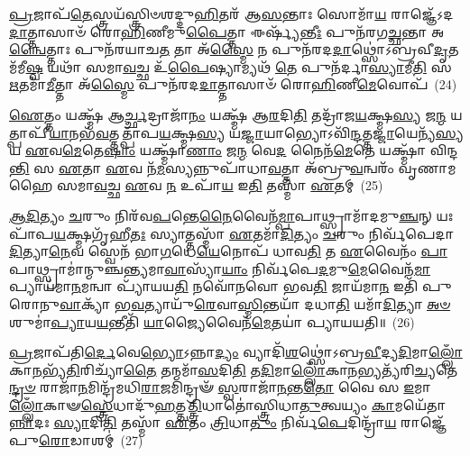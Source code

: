 {\anuvakamend[{\-\ul{𑌏}\-𑌵 𑌨𑌿𑌰𑌗𑍍𑌰᳴\-\ul{𑌮𑍇}\-𑌤𑌸𑍍𑌯᳴ \ul{𑌚}\-𑌤𑍍𑌵𑌾𑌰𑌿᳴ 𑌚}]}%

\-\ul{𑌪𑍍𑌰}\-𑌜𑌾𑌪᳴\-\ul{𑌤𑍇}\-𑌸𑍍𑌤𑍍𑌰𑌯᳴𑌸𑍍𑌤𑍍𑌰𑌿𑍞𑌶𑌦𑍍𑌦𑍁\-\ul{𑌹𑌿}\-𑌤𑌰᳴ 𑌆\-\ul{𑌸}\-𑌨𑍍𑌤𑌾𑌃 𑌸𑍋𑌮𑌾᳴\-\ul{𑌯} 𑌰𑌾𑌜𑍍𑌞𑍇᳴\-𑌽𑌦\-\ul{𑌦𑌾}\-𑌤𑍍𑌤𑌾𑌸𑌾𑍞᳴ 𑌰𑍋\-\ul{𑌹𑌿}\-𑌣𑍀𑌮𑍁\-\ul{𑌪𑍈}\-𑌤𑍍𑌤𑌾 𑌈𑌰𑍍𑌷𑍍𑌯᳴\-\ul{𑌨𑍍𑌤𑍀𑌃} 𑌪𑍁𑌨᳴𑌰𑌗\-\ul{𑌚𑍍𑌛}\-𑌨𑍍𑌤𑌾 𑌅\-\ul{𑌨𑍍𑌵𑍈}\-𑌤𑍍𑌤𑌾𑌃 𑌪𑍁𑌨᳴𑌰𑌯𑌾𑌚\-\ul{𑌤} 𑌤𑌾 𑌅᳴\-\ul{𑌸𑍍𑌮𑍈} 𑌨 𑌪𑍁𑌨᳴𑌰𑌦\-\ul{𑌦𑌾}\-𑌥𑍍𑌸𑍋॑\-𑌽𑌬𑍍𑌰𑌵𑍀\-\ul{𑌦𑍃}\-𑌤𑌮᳴𑌮𑍀\-\ul{𑌷𑍍𑌵} 𑌯𑌥𑌾᳴ 𑌸𑌮𑌾\-\ul{𑌵}\-𑌚𑍍𑌛 𑌉᳴\-\ul{𑌪𑍈}\-𑌷𑍍𑌯𑌾𑌮𑍍𑌯𑌥᳴ \ul{𑌤𑍇} 𑌪𑍁𑌨᳴𑌰𑍍𑌦𑌾\-\ul{𑌸𑍍𑌯𑌾}\-𑌮𑍀\-\ul{𑌤𑌿} 𑌸 \ul{𑌋}\-𑌤𑌮𑌾᳴\-\ul{𑌮𑍀}\-𑌤𑍍𑌤𑌾 𑌅᳴\-\ul{𑌸𑍍𑌮𑍈} 𑌪𑍁𑌨᳴𑌰𑌦\-\ul{𑌦𑌾}\-𑌤𑍍𑌤𑌾𑌸𑌾𑍞᳴ 𑌰𑍋\-\ul{𑌹𑌿}\-𑌣𑍀\-\ul{𑌮𑍇}\-𑌵𑍋𑌪᳴~(24)

\-\ul{𑌐}\-𑌤𑍍𑌤𑌂 𑌯𑌕𑍍𑌷𑍍𑌮᳴ 𑌆\-\ul{𑌰𑍍𑌚𑍍𑌛}\-𑌦𑍍𑌰𑌾𑌜𑌾᳴\-\ul{𑌨𑌂} 𑌯𑌕𑍍𑌷𑍍𑌮᳴ 𑌆\-\ul{𑌰}\-𑌦𑌿\-\ul{𑌤𑌿} 𑌤𑌦𑍍𑌰𑌾᳴𑌜\-\ul{𑌯}\-𑌕𑍍𑌷𑍍𑌮\-\ul{𑌸𑍍𑌯} 𑌜\-\ul{𑌨𑍍𑌮} 𑌯𑌤𑍍𑌪𑌾𑌪𑍀᳴\-\ul{𑌯𑌾}\-𑌨𑌭᳴\-\ul{𑌵}\-𑌤𑍍𑌤𑌤𑍍𑌪𑌾᳴𑌪\-\ul{𑌯}\-𑌕𑍍𑌷𑍍𑌮\-\ul{𑌸𑍍𑌯} 𑌯\-\ul{𑌜𑍍𑌜𑌾}\-𑌯𑌾𑌭𑍍𑌯𑍋\-𑌽𑌵𑌿᳴\-\ul{𑌨𑍍𑌦}\-𑌤𑍍𑌤\-\ul{𑌜𑍍𑌜𑌾}\-𑌯𑍇𑌨𑍍𑌯᳴\-\ul{𑌸𑍍𑌯} 𑌯 \ul{𑌏}\-𑌵\-\ul{𑌮𑍇}\-𑌤𑍇\-\ul{𑌷𑌾𑌂} 𑌯𑌕𑍍𑌷𑍍𑌮𑌾᳴\-\ul{𑌣𑌾𑌂} 𑌜\-\ul{𑌨𑍍𑌮} 𑌵𑍇\-\ul{𑌦} 𑌨𑍈𑌨᳴\-\ul{𑌮𑍇}\-𑌤𑍇 𑌯𑌕𑍍𑌷𑍍𑌮𑌾᳴ 𑌵𑌿𑌨𑍍𑌦\-\ul{𑌨𑍍𑌤𑌿} 𑌸 \ul{𑌏}\-𑌤𑌾 \ul{𑌏}\-𑌵 𑌨᳴\-\ul{𑌮}\-𑌸𑍍𑌯𑌨𑍍𑌨𑍁𑌪𑌾᳴𑌧𑌾\-\ul{𑌵}\-𑌤𑍍𑌤𑌾 𑌅᳴𑌬𑍍𑌰𑍁\-\ul{𑌵}\-𑌨𑍍𑌵𑌰𑌂᳴ 𑌵𑍃𑌣𑌾𑌮𑌹𑍈 𑌸𑌮𑌾\-\ul{𑌵}\-𑌚𑍍𑌛 \ul{𑌏}\-𑌵 \ul{𑌨} 𑌉𑌪𑌾᳴\-\ul{𑌯} 𑌇\-\ul{𑌤𑌿} 𑌤𑌸𑍍𑌮𑌾᳴ \ul{𑌏}\-𑌤𑌮𑍍~(25)

\-\ul{𑌆}\-\-\ul{𑌦𑌿}\-𑌤𑍍𑌯𑌂 \ul{𑌚}\-𑌰𑍁𑌂 𑌨𑌿𑌰᳴𑌵\-\ul{𑌪}\-𑌨𑍍𑌤𑍇\-\ul{𑌨𑍈}\-𑌵𑍈𑌨᳴\-\ul{𑌮𑍍𑌪𑌾}\-𑌪𑌾𑌥𑍍𑌸𑍍𑌰𑌾𑌮𑌾᳴𑌦𑌮𑍁\-\ul{𑌞𑍍𑌚}\-𑌨𑍍 𑌯𑌃 𑌪𑌾᳴𑌪\-\ul{𑌯}\-𑌕𑍍𑌷𑍍𑌮𑌗𑍃᳴𑌹𑍀\-\ul{𑌤𑌃} 𑌸𑍍𑌯𑌾𑌤𑍍𑌤𑌸𑍍𑌮𑌾᳴ \ul{𑌏}\-𑌤𑌮𑌾᳴\-\ul{𑌦𑌿}\-𑌤𑍍𑌯𑌂 \ul{𑌚}\-𑌰𑍁𑌂 𑌨𑌿𑌰𑍍𑌵᳴𑌪𑍇𑌦𑌾\-\ul{𑌦𑌿}\-𑌤𑍍𑌯𑌾\-\ul{𑌨𑍇}\-𑌵 𑌸𑍍𑌵𑍇𑌨᳴ 𑌭𑌾\-\ul{𑌗}\-𑌧𑍇\-\ul{𑌯𑍇}\-𑌨𑍋𑌪᳴ 𑌧𑌾𑌵\-\ul{𑌤𑌿} 𑌤 \ul{𑌏}\-𑌵𑍈𑌨𑌂᳴ \ul{𑌪𑌾}\-𑌪𑌾𑌥𑍍𑌸𑍍𑌰𑌾𑌮𑌾॑𑌨𑍍𑌮𑍁𑌞𑍍𑌚𑌨𑍍𑌤𑍍𑌯𑌮𑌾\-\ul{𑌵𑌾}\-𑌸𑍍𑌯𑌾᳴\-\ul{𑌯𑌾𑌂} 𑌨𑌿𑌰𑍍𑌵᳴𑌪𑍇\-\ul{𑌦}\-𑌮𑍁\-\ul{𑌮𑍇}\-𑌵𑍈𑌨᳴\-\ul{𑌮𑌾}\-𑌪𑍍𑌯𑌾𑌯᳴𑌮𑌾\-\ul{𑌨}\-𑌮𑌨𑍍𑌵𑌾 𑌪𑍍𑌯𑌾᳴𑌯𑌯\-\ul{𑌤𑌿} 𑌨𑌵𑍋᳴𑌨𑌵𑍋 𑌭𑌵\-\ul{𑌤𑌿} 𑌜𑌾𑌯᳴𑌮𑌾\-\ul{𑌨} 𑌇𑌤𑌿᳴ 𑌪𑍁𑌰𑍋𑌨𑍁\-\ul{𑌵𑌾}\-𑌕𑍍𑌯𑌾᳴ 𑌭\-\ul{𑌵}\-𑌤𑍍𑌯𑌾𑌯𑍁᳴\-\ul{𑌰𑍇}\-𑌵𑌾\-\ul{𑌸𑍍𑌮𑌿}\-𑌨𑍍𑌤𑌯𑌾᳴ 𑌦𑌧𑌾\-\ul{𑌤𑌿} 𑌯𑌮𑌾᳴\-\ul{𑌦𑌿}\-𑌤𑍍𑌯𑌾 \ul{𑌅}\-\-\ul{𑍞}\-𑌶𑍁𑌮𑌾॑\-\ul{𑌪𑍍𑌯𑌾}\-𑌯\-\ul{𑌯}\-𑌨𑍍𑌤𑍀𑌤𑌿᳴ \ul{𑌯𑌾}\-𑌜𑍍𑌯𑍈𑌵𑍈𑌨᳴\-\ul{𑌮𑍇}\-𑌤𑌯𑌾॑ 𑌪𑍍𑌯𑌾𑌯𑌯𑌤𑌿॥~(26)

{\anuvakamend[{\-\ul{𑌏}\-𑌵𑍋\-\ul{𑌪𑍈}\-𑌤𑌮᳴\-\ul{𑌸𑍍𑌮𑌿}\-𑌨𑍍𑌤𑍍𑌰𑌯𑍋᳴𑌦𑌶 𑌚}]}%

\-\ul{𑌪𑍍𑌰}\-𑌜𑌾𑌪᳴𑌤𑌿\-\ul{𑌰𑍍𑌦𑍇}\-𑌵𑍇\-\ul{𑌭𑍍𑌯𑍋}\-\-𑌽𑌨𑍍𑌨𑌾\-\ul{𑌦𑍍𑌯𑌂} 𑌵𑍍𑌯𑌾𑌦𑌿᳴\-\ul{𑌶}\-𑌥𑍍𑌸𑍋॑\-𑌽𑌬𑍍𑌰\-\ul{𑌵𑍀}\-𑌦𑍍𑌯\-\ul{𑌦𑌿}\-𑌮𑌾\-\ul{𑌲𑍍𑌲𑍋𑌁}\-𑌕𑌾\-\ul{𑌨}\-𑌭𑍍𑌯᳴\-\ul{𑌤𑌿}\-𑌰𑌿𑌚𑍍𑌯𑌾᳴\-\ul{𑌤𑍈} 𑌤𑌨𑍍𑌮𑌮𑌾᳴\-\ul{𑌸}\-𑌦𑌿\-\ul{𑌤𑌿} 𑌤\-\ul{𑌦𑌿}\-𑌮𑌾\-\ul{𑌲𑍍𑌲𑍋𑌁}\-𑌕𑌾\-\ul{𑌨}\-𑌭𑍍𑌯𑌤𑍍𑌯᳴𑌰𑌿\-\ul{𑌚𑍍𑌯}\-𑌤𑍇\-\ul{𑌨𑍍𑌦𑍍𑌰}\-\-\ul{𑍞} 𑌰𑌾𑌜𑌾᳴\-\ul{𑌨}\-𑌮𑌿𑌨𑍍𑌦𑍍𑌰᳴𑌮𑌧𑌿\-\ul{𑌰𑌾}\-𑌜𑌮𑌿𑌨𑍍𑌦𑍍𑌰𑍟᳴ \ul{𑌸𑍍𑌵}\-𑌰𑌾𑌜𑌾᳴\-\ul{𑌨}\-𑌨𑍍𑌤\-\ul{𑌤𑍋} 𑌵𑍈 𑌸 \ul{𑌇}\-𑌮𑌾\-\ul{𑌲𑍍𑌲𑍋𑌁}\-𑌕𑌾𑍟\-\ul{𑌸𑍍𑌤𑍍𑌰𑍇}\-𑌧𑌾𑌦𑍁᳴\-\ul{𑌹}\-𑌤𑍍𑌤\-\ul{𑌤𑍍𑌤𑍍𑌰𑌿}\-𑌧𑌾𑌤𑍋॑𑌸𑍍𑌤𑍍𑌰𑌿𑌧𑌾\-\ul{𑌤𑍁}\-𑌤𑍍𑌵𑌯𑍍𑌯𑌂 \ul{𑌕𑌾}\-𑌮𑌯𑍇᳴𑌤𑌾\-\ul{𑌨𑍍𑌨𑌾}\-𑌦𑌃 \ul{𑌸𑍍𑌯𑌾}\-𑌦𑌿\-\ul{𑌤𑌿} 𑌤𑌸𑍍𑌮𑌾᳴ \ul{𑌏}\-𑌤𑌂 \ul{𑌤𑍍𑌰𑌿}\-𑌧𑌾\-\ul{𑌤𑍁𑌂} 𑌨𑌿𑌰𑍍𑌵᳴\-\ul{𑌪𑍇}\-𑌦𑌿𑌨𑍍𑌦𑍍𑌰𑌾᳴\-\ul{𑌯} 𑌰𑌾𑌜𑍍𑌞𑍇᳴ 𑌪𑍁\-\ul{𑌰𑍋}\-𑌡𑌾𑌶𑌮𑍍॑~(27)

